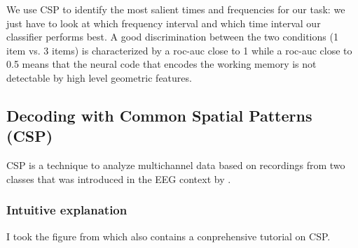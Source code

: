 We use CSP to identify the most salient times and frequencies for our task: we just have to look at which frequency interval and which time interval our classifier performs best. A good discrimination between the two conditions (1 item vs. 3 items) is characterized by a roc-auc close to 1 while a roc-auc close to 0.5 means that the neural code that encodes the working memory is not detectable by high level geometric features.

\subsection{Decoding with Common Spatial Patterns (CSP)}

CSP is a technique to analyze multichannel data based on recordings from two classes that was introduced in the EEG context by \cite{koles1990spatial}. 

\subsubsection{Intuitive explanation}


I took the figure from \cite{blankertz2007optimizing} which also contains a conprehensive tutorial on CSP.

